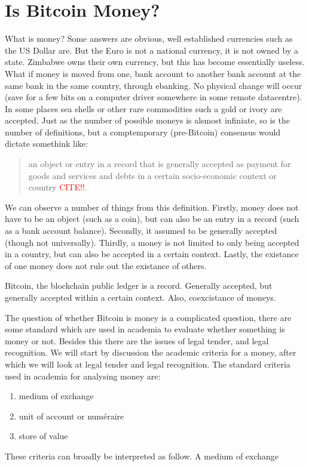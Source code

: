 
\chapter{Is Bitcoin Money?}

What is money? Some answers are obvious, well established currencies
such as the US Dollar are. But the Euro is not a national currency,
it is not owned by a state. Zimbabwe owns their own currency, but
this has become essentially useless. What if money is moved from one,
bank account to another bank account at the same bank in the same
country, through ebanking. No physical change will occur (save for
a few bits on a computer driver somewhere in some remote datacentre).
In some places sea shells or other rare commodities such a gold or
ivory are accepted. Just as the number of possible moneys is alsmost
infiniate, so is the number of definitions, but a comptemporary (pre-Bitcoin)
consensus would dictate somethink like: 
\begin{quotation}
an object or entry in a record that is generally accepted as payment
for goods and services and debts in a certain socio-economic context
or country \textcolor{red}{CITE!!}.
\end{quotation}
We can observe a number of things from this definition. Firstly, money
does not have to be an object (such as a coin), but can also be an
entry in a record (such as a bank account balance). Secondly, it assumed
to be generally accepted (though not universally). Thirdly, a money
is not limited to only being accepted in a country, but can also be
accepted in a certain context. Lastly, the existance of one money
does not rule out the existance of others.

Bitcoin, the blockchain public ledger is a record. Generally accepted,
but generally accepted within a certain context. Also, coexcistance
of moneys.

The question of whether Bitcoin is money is a complicated question,
there are some standard which are used in academia to evaluate whether
something is money or not. Besides this there are the issues of legal
tender, and legal recognition. We will start by discussion the academic
criteria for a money, after which we will look at legal tender and
legal recognition. The standard criteria used in academia for analysing
money are:
\begin{enumerate}
\item medium of exchange
\item unit of account or numéraire
\item store of value
\end{enumerate}
These criteria can broadly be interpreted as follow. A medium of exchange

